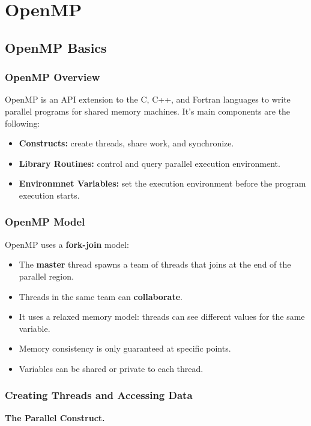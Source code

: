 \section{OpenMP}

\subsection{OpenMP Basics}
\subsubsection{OpenMP Overview}
OpenMP is an API extension to the C, C++, and Fortran languages to write parallel programs for shared memory machines. It's main components are the following:
\begin{itemize}
    \item \textbf{Constructs:} create threads, share work, and synchronize.
    \item \textbf{Library Routines:} control and query parallel execution environment.
    \item \textbf{Environmnet Variables:} set the execution environment before the program execution starts.
\end{itemize}

\subsubsection{OpenMP Model}
OpenMP uses a \textbf{fork-join} model:
\begin{itemize}
    \item The \textbf{master} thread spawns a team of threads that joins at the end of the parallel region.
    \item Threads in the same team can \textbf{collaborate}.
    \item It uses a relaxed memory model: threads can see different values for the same variable.
    \item Memory consistency is only guaranteed at specific points.
    \item Variables can be shared or private to each thread.
\end{itemize}

\subsubsection{Creating Threads and Accessing Data}

\textbf{The Parallel Construct.}

